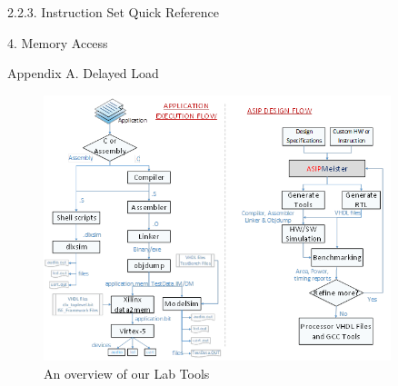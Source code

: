 	2.2.3. Instruction Set Quick Reference
	
	4. Memory Access
	
	Appendix A. Delayed Load

\begin{figure}[!htb]
	\centering
	\includegraphics[width=0.9\textwidth]{src/images/image1.png}
	\caption{An overview of our Lab Tools}
	\label{fig:fig1}
\end{figure}